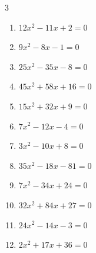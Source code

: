 \begin{multicols}{3}
\begin{enumerate}

  \item $12x^{2}-11x+2=0$


  \item $9x^{2}-8x-1=0$


  \item $25x^{2}-35x-8=0$


  \item $45x^{2}+58x+16=0$


  \item $15x^{2}+32x+9=0$


\columnbreak %

  \item $7x^{2}-12x-4=0$


  \item $3x^{2}-10x+8=0$


  \item $35x^{2}-18x-81=0$


  \item $7x^{2}-34x+24=0$


  \item $32x^{2}+84x+27=0$


  \item $24x^{2}-14x-3=0$


  \item $2x^{2}+17x+36=0$



\end{enumerate}
\end{multicols}
